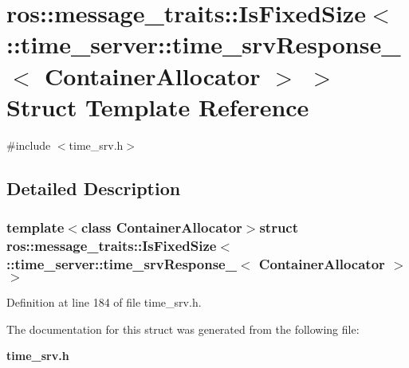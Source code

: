 \section{ros\-:\-:message\-\_\-traits\-:\-:\-Is\-Fixed\-Size$<$ \-:\-:time\-\_\-server\-:\-:time\-\_\-srv\-Response\-\_\-$<$ \-Container\-Allocator $>$ $>$ \-Struct \-Template \-Reference}
\label{structros_1_1message__traits_1_1IsFixedSize_3_01_1_1time__server_1_1time__srvResponse___3_01ContainerAllocator_01_4_01_4}


{\ttfamily \#include $<$time\-\_\-srv.\-h$>$}



\subsection{\-Detailed \-Description}
\subsubsection*{template$<$class Container\-Allocator$>$struct ros\-::message\-\_\-traits\-::\-Is\-Fixed\-Size$<$ \-::time\-\_\-server\-::time\-\_\-srv\-Response\-\_\-$<$ Container\-Allocator $>$ $>$}



\-Definition at line 184 of file time\-\_\-srv.\-h.



\-The documentation for this struct was generated from the following file\-:\begin{DoxyCompactItemize}
\item 
{\bf time\-\_\-srv.\-h}\end{DoxyCompactItemize}
